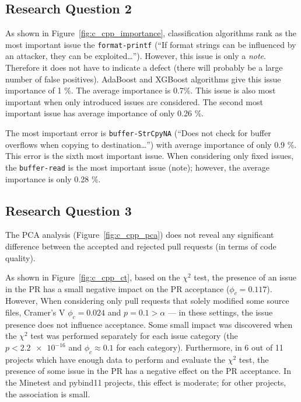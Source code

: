 \documentclass[digital,oneside,oldtable,nolof,nolot,nocover]{fithesis4}
\begin{document}
\subsection{Research Question 2}
\label{sec:org888a2fd}
As shown in Figure~\ref{fig:c_cpp_importance},
classification algorithms rank as the most important issue the
\texttt{format-printf} (``If format strings can be influenced by an attacker, they
can be exploited\dots{}''). However, this issue is only a \emph{note}.  Therefore it
does not have to indicate a defect (there will probably be a large number of
false positives). AdaBoost and XGBoost algorithms give this issue importance
of 1 \%. The average importance is 0.7\%.  This issue is also most important
when only introduced issues are considered. The second most important issue has
average importance of only 0.26 \%.

The most important error is \texttt{buffer-StrCpyNA} (``Does not check for buffer
overflows when copying to destination\dots{}'') with average importance of only
0.9 \%. This error is the sixth most important issue.
When considering only fixed issues, the \texttt{buffer-read} is the most important issue (note);
however, the average importance is only 0.28 \%.
\subsection{Research Question 3}
\label{sec:orgc006a7b}
The PCA analysis (Figure~\ref{fig:c_cpp_pca})
does not reveal any significant difference between the accepted
and rejected pull requests (in terms of code quality).

As shown in Figure~\ref{fig:c_cpp_ct}, based on the \(\chi^2\) test,
the presence of an issue in the PR has a small negative impact
on the PR acceptance (\(\phi_c = 0.117\)).
However, When considering only pull requests that solely modified some source files,
Cramer's V \(\phi_c = 0.024\) and \(p = 0.1 > \alpha\) --- in these settings, the issue presence
does not influence acceptance.
Some small impact was discovered when the \(\chi^2\) test was performed separately for
each issue category (the \(p < \num{2.2e-16}\) and \(\phi_c \approx 0.1\) for each category).
Furthermore, in 6 out of 11 projects which have enough data to perform and evaluate the \(\chi^2\) test,
the presence of some issue in the PR has a negative effect on the PR acceptance.
In the Minetest and pybind11 projects, this effect is moderate;
for other projects, the association is small.
\end{document}
